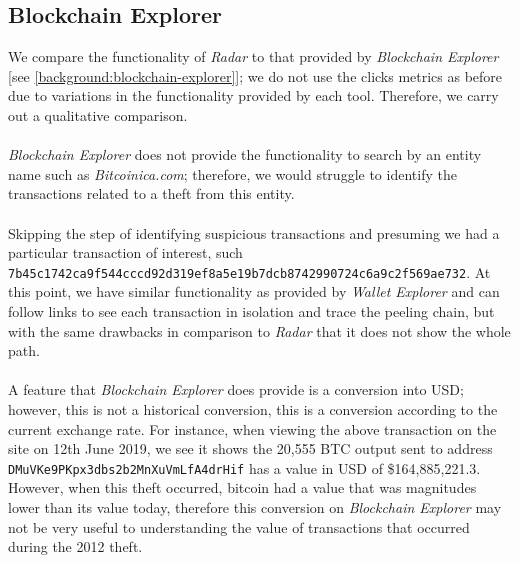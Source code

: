 \subsection{Blockchain Explorer}
We compare the functionality of \textit{Radar} to that provided by \textit{Blockchain Explorer} [see \ref{background:blockchain-explorer}]; we do not use the clicks metrics as before due to variations in the functionality provided by each tool. Therefore, we carry out a qualitative comparison.
\\\\
\textit{Blockchain Explorer} does not provide the functionality to search by an entity name such as \textit{Bitcoinica.com}; therefore, we would struggle to identify the transactions related to a theft from this entity. 
\\\\
Skipping the step of identifying suspicious transactions and presuming we had a particular transaction of interest, such \texttt{7b45c1742ca9f544cccd92d319ef8a5e19b7dcb8742990724c6a9c2f569ae732}. At this point, we have similar functionality as provided by \textit{Wallet Explorer} and can follow links to see each transaction in isolation and trace the peeling chain, but with the same drawbacks in comparison to \textit{Radar} that it does not show the whole path. 
\\\\
A feature that \textit{Blockchain Explorer} does provide is a conversion into USD; however, this is not a historical conversion, this is a conversion according to the current exchange rate. For instance, when viewing the above transaction on the site on 12th June 2019, we see it shows the 20,555 BTC output sent to address \texttt{DMuVKe9PKpx3dbs2b2MnXuVmLfA4drHif} has a value in USD of \$164,885,221.3. However, when this theft occurred, bitcoin had a value that was magnitudes lower than its value today, therefore this conversion on \textit{Blockchain Explorer} may not be very useful to understanding the value of transactions that occurred during the 2012 theft. 

